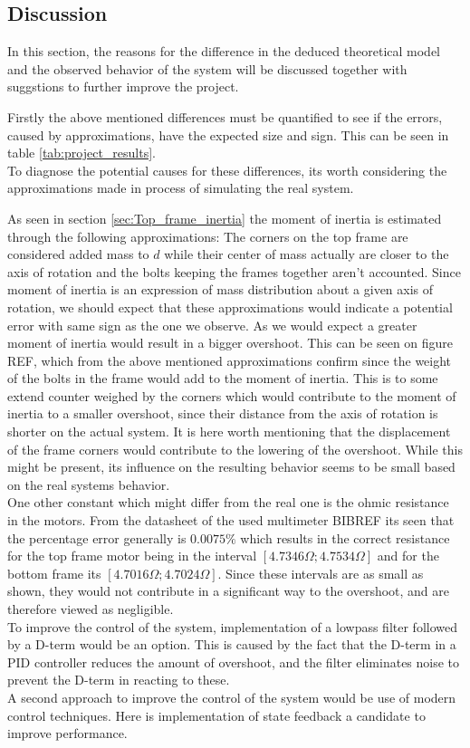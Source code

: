 \documentclass[../../main]{subfiles}
\begin{document}
\subsection{Discussion}
\label{sec:discussion}
In this section, the reasons for the difference in the deduced theoretical model and the observed behavior of the system will be discussed together with suggstions to further improve the project.

Firstly the above mentioned differences must be quantified to see if the errors, caused by approximations, have the expected size and sign. This can be seen in table \ref{tab:project_results}.\\

To diagnose the potential causes for these differences, its worth considering the approximations made in process of simulating the real system.

As seen in section \ref{sec:Top_frame_inertia} the moment of inertia is estimated through the following approximations: The corners on the top frame are considered added mass to $d$ while their center of mass actually are closer to the axis of rotation and the bolts keeping the frames together aren't accounted. Since moment of inertia is an expression of mass distribution about a given axis of rotation, we should expect that these approximations would indicate a potential error with same sign as the one we observe. As we would expect a greater moment of inertia would result in a bigger overshoot. This can be seen on figure REF, which from the above mentioned approximations confirm since the weight of the bolts in the frame would add to the moment of inertia. This is to some extend counter weighed by the corners which would contribute to the moment of inertia to a smaller overshoot, since their distance from the axis of rotation is shorter on the actual system. It is here worth mentioning that the displacement of the frame corners would contribute to the lowering of the overshoot. While this might be present, its influence on the resulting behavior seems to be small based on the real systems behavior.\\
One other constant which might differ from the real one is the ohmic resistance in the motors. From the datasheet of the used multimeter BIBREF its seen that the percentage error generally is $0.0075\%$ which results in the correct resistance for the top frame motor being in the interval $[4.7346\Omega;4.7534\Omega]$ and for the bottom frame its $[4.7016\Omega;4.7024\Omega]$. Since these intervals are as small as shown, they would not contribute in a significant way to the overshoot, and are therefore viewed as negligible.\\

To improve the control of the system, implementation of a lowpass filter followed by a D-term would be an option. This is caused by the fact that the D-term in a PID controller reduces the amount of overshoot, and the filter eliminates noise to prevent the D-term in reacting to these.\\
A second approach to improve the control of the system would be use of modern control techniques. Here is implementation of state feedback a candidate to improve performance.
\end{document}
